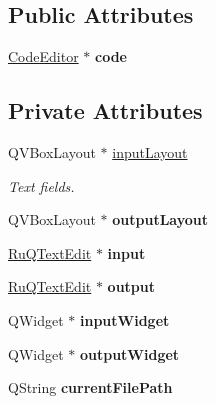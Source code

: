 \subsection*{Public Attributes}
\begin{DoxyCompactItemize}
\item 
\hypertarget{class_tab_a2ca89e986540f7ad32fd78712ed078ec}{}\hyperlink{class_code_editor}{Code\+Editor} $\ast$ {\bfseries code}\label{class_tab_a2ca89e986540f7ad32fd78712ed078ec}

\end{DoxyCompactItemize}
\subsection*{Private Attributes}
\begin{DoxyCompactItemize}
\item 
\hypertarget{class_tab_a177d0ededc7732e0eb9f4ab3946a0613}{}Q\+V\+Box\+Layout $\ast$ \hyperlink{class_tab_a177d0ededc7732e0eb9f4ab3946a0613}{input\+Layout}\label{class_tab_a177d0ededc7732e0eb9f4ab3946a0613}

\begin{DoxyCompactList}\small\item\em Text fields. \end{DoxyCompactList}\item 
\hypertarget{class_tab_a2022402e6791f8706264ead579db8ddb}{}Q\+V\+Box\+Layout $\ast$ {\bfseries output\+Layout}\label{class_tab_a2022402e6791f8706264ead579db8ddb}

\item 
\hypertarget{class_tab_a0b1098aee5962a413385026bb97217ad}{}\hyperlink{class_ru_q_text_edit}{Ru\+Q\+Text\+Edit} $\ast$ {\bfseries input}\label{class_tab_a0b1098aee5962a413385026bb97217ad}

\item 
\hypertarget{class_tab_a487419863e6026db90ecdeb1e312e98d}{}\hyperlink{class_ru_q_text_edit}{Ru\+Q\+Text\+Edit} $\ast$ {\bfseries output}\label{class_tab_a487419863e6026db90ecdeb1e312e98d}

\item 
\hypertarget{class_tab_a9035df5e25ea1c063800729c208899da}{}Q\+Widget $\ast$ {\bfseries input\+Widget}\label{class_tab_a9035df5e25ea1c063800729c208899da}

\item 
\hypertarget{class_tab_ac9e36aa86c10d2222c7c64146e8ccdc4}{}Q\+Widget $\ast$ {\bfseries output\+Widget}\label{class_tab_ac9e36aa86c10d2222c7c64146e8ccdc4}

\item 
\hypertarget{class_tab_a2fcfb7fc3caf22a3e024efde604385b4}{}Q\+String {\bfseries current\+File\+Path}\label{class_tab_a2fcfb7fc3caf22a3e024efde604385b4}

\end{DoxyCompactItemize}



